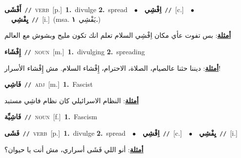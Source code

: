 \documentclass[10pt,a4paper,twoside]{article} %
\begin{document}
\begin{multicols}{2}
{\setlength\topsep{0pt}\textbf{\foreignlanguage{arabic}{أَفْشَى}}\ {\color{gray}\texttt{//}\color{black}}\ \textsc{verb}\ [p.]\ \textbf{1.}~divulge  \textbf{2.}~spread\ \ $\bullet$\ \ \setlength\topsep{0pt}\textbf{\foreignlanguage{arabic}{اِفْشِي}}\ {\color{gray}\texttt{//}\color{black}}\ [c.]\ \ $\bullet$\ \ \setlength\topsep{0pt}\textbf{\foreignlanguage{arabic}{يِفْشِي}}\ {\color{gray}\texttt{//}\color{black}}\ [i.]\ \color{gray}(msa. \foreignlanguage{arabic}{يَفْشِي}~\foreignlanguage{arabic}{\textbf{١.}})\color{black}\  \begin{flushright}\color{gray}\foreignlanguage{arabic}{\textbf{\underline{\foreignlanguage{arabic}{أمثلة}}}: بس تفوت عأي مكان اِفْشِي السلام تعلم انك تكون مليح وبشوش مع العالم}\end{flushright}\color{black}} \vspace{2mm}

{\setlength\topsep{0pt}\textbf{\foreignlanguage{arabic}{إِفْشَاء}}\ {\color{gray}\texttt{//}\color{black}}\ \textsc{noun}\ [m.]\ \textbf{1.}~divulging  \textbf{2.}~spreading\  \begin{flushright}\color{gray}\foreignlanguage{arabic}{\textbf{\underline{\foreignlanguage{arabic}{أمثلة}}}: ديننا حثنا عالصيام، الصلاة، الاحترام، إِفْشاء السلام. مش إِفْشاء الأسرار!}\end{flushright}\color{black}} \vspace{2mm}

{\setlength\topsep{0pt}\textbf{\foreignlanguage{arabic}{فَاشِي}}\ {\color{gray}\texttt{//}\color{black}}\ \textsc{adj}\ [m.]\ \textbf{1.}~Fascist\  \begin{flushright}\color{gray}\foreignlanguage{arabic}{\textbf{\underline{\foreignlanguage{arabic}{أمثلة}}}: النظام الاسرائيلي كان نظام فاشِي مستبد}\end{flushright}\color{black}} \vspace{2mm}

{\setlength\topsep{0pt}\textbf{\foreignlanguage{arabic}{فَاشِيِّة}}\ {\color{gray}\texttt{//}\color{black}}\ \textsc{noun}\ [f.]\ \textbf{1.}~Fascism\ } \vspace{2mm}

{\setlength\topsep{0pt}\textbf{\foreignlanguage{arabic}{فَشَى}}\ {\color{gray}\texttt{//}\color{black}}\ \textsc{verb}\ [p.]\ \textbf{1.}~divulge  \textbf{2.}~spread\ \ $\bullet$\ \ \setlength\topsep{0pt}\textbf{\foreignlanguage{arabic}{اِفْشِي}}\ {\color{gray}\texttt{//}\color{black}}\ [c.]\ \ $\bullet$\ \ \setlength\topsep{0pt}\textbf{\foreignlanguage{arabic}{يِفْشِي}}\ {\color{gray}\texttt{//}\color{black}}\ [i.]\  \begin{flushright}\color{gray}\foreignlanguage{arabic}{\textbf{\underline{\foreignlanguage{arabic}{أمثلة}}}: أنو اللي فَشَى أسراري، مش أنت يا حيوان؟}\end{flushright}\color{black}} \vspace{2mm}


\end{multicols}
\end{document}
